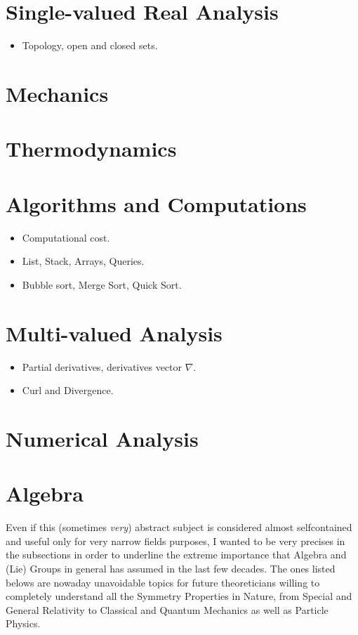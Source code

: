 \documentclass[10pt]{article}
\begin{document}
\section{Single-valued Real Analysis}
\begin{itemize}
	\item Topology, open and closed sets.
\end{itemize}

\section{Mechanics}

\section{Thermodynamics}

\section{Algorithms and Computations}
\begin{itemize}
	\item Computational cost.
	\item List, Stack, Arrays, Queries.
	\item Bubble sort, Merge Sort, Quick Sort.
\end{itemize}
\section{Multi-valued Analysis}
\begin{itemize}
	\item Partial derivatives, derivatives vector $ \nabla $.
	\item Curl and Divergence. 
\end{itemize}
\section{Numerical Analysis}
\section{Algebra}
Even if this (sometimes \emph{very}) abstract subject is considered almost selfcontained and useful only for very narrow fields purposes, I wanted to be very precises in the subsections in order to underline the extreme importance that Algebra and (Lie) Groups in general has assumed in the last few decades. The ones listed belows are nowaday unavoidable topics for future theoreticians willing to completely understand all the Symmetry Properties in Nature, from Special and General Relativity to Classical and Quantum Mechanics as well as Particle Physics. 
\end{document}
